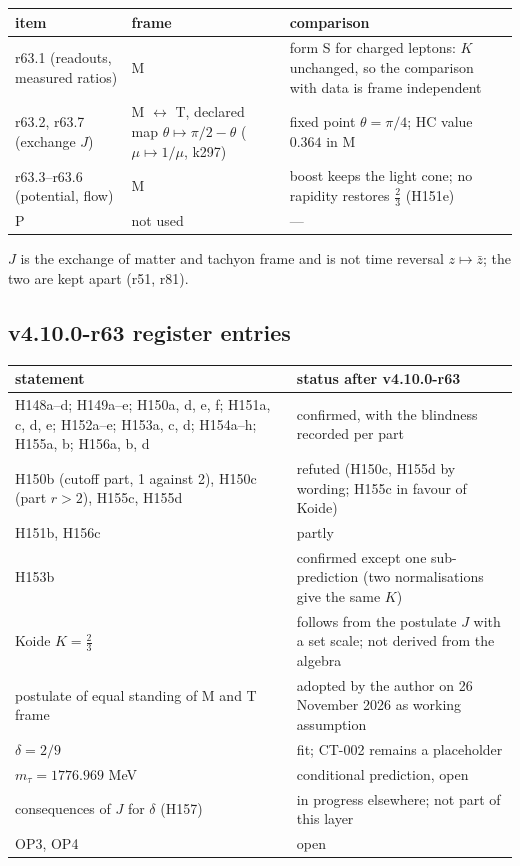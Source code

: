 \begin{center}
\small
\begin{tabular}{@{}>{\raggedright\arraybackslash}p{}>{\raggedright\arraybackslash}p{}>{\raggedright\arraybackslash}p{}@{}}
\toprule
item & frame & comparison\\
\midrule
r63.1 (readouts, measured ratios) & M & form S for charged leptons: \(K\) unchanged, so the comparison with data is frame independent\\
r63.2, r63.7 (exchange \(J\)) & M \(\leftrightarrow\) T, declared map \(\theta\mapsto\pi/2-\theta\) (\(\mu\mapsto1/\mu\), k297) & fixed point \(\theta=\pi/4\); HC value \(0.364\) in M\\
r63.3--r63.6 (potential, flow) & M & boost keeps the light cone; no rapidity restores \(\tfrac23\) (H151e)\\
P & not used & ---\\
\bottomrule
\end{tabular}
\end{center}
\(J\) is the exchange of matter and tachyon frame and is not time reversal \(z\mapsto\bar z\); the two are kept apart (r51, r81).

\subsection*{v4.10.0-r63 register entries}
\label{subsec:v4100-r63-register}

\begin{center}
\small
\begin{tabular}{@{}>{\raggedright\arraybackslash}p{}>{\raggedright\arraybackslash}p{}@{}}
\toprule
statement & status after v4.10.0-r63\\
\midrule
H148a--d; H149a--e; H150a, d, e, f; H151a, c, d, e; H152a--e; H153a, c, d; H154a--h; H155a, b; H156a, b, d & confirmed, with the blindness recorded per part\\
H150b (cutoff part, 1 against 2), H150c (part \(r>2\)), H155c, H155d & refuted (H150c, H155d by wording; H155c in favour of Koide)\\
H151b, H156c & partly\\
H153b & confirmed except one sub-prediction (two normalisations give the same \(K\))\\
Koide \(K=\tfrac23\) & follows from the postulate \(J\) with a set scale; not derived from the algebra\\
postulate of equal standing of M and T frame & adopted by the author on 26 November 2026 as working assumption\\
\(\delta=2/9\) & fit; CT-002 remains a placeholder\\
\(m_\tau=1776.969\) MeV & conditional prediction, open\\
consequences of \(J\) for \(\delta\) (H157) & in progress elsewhere; not part of this layer\\
OP3, OP4 & open\\
\bottomrule
\end{tabular}
\end{center}

